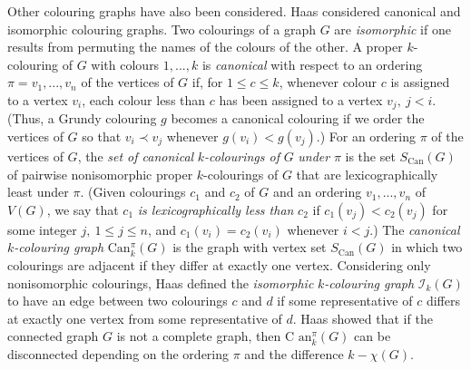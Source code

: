\documentclass[12pt]{article}%
\begin{document}


Other colouring graphs have also been considered. Haas \cite{26CM-Haas2012}
considered canonical and isomorphic colouring graphs. Two colourings of a
graph $G$ are \emph{isomorphic} if one results from permuting the names of the
colours of the other. A proper $k$-colouring of $G$ with colours $1,...,k$ is
\emph{canonical} with respect to an ordering $\pi=v_{1},...,v_{n}$ of the
vertices of $G$ if, for $1\leq c\leq k$, whenever colour $c$ is assigned to a
vertex $v_{i}$, each colour less than $c$ has been assigned to a vertex
$v_{j},\ j<i$. (Thus, a Grundy colouring $g$ becomes a canonical colouring if
we order the vertices of $G$ so that $v_{i}\prec v_{j}$ whenever
$g(v_{i})<g(v_{j})$.) For an ordering $\pi$ of the vertices of $G$, the
\emph{set of canonical }$k$\emph{-colourings of }$G$\emph{ under }$\pi$ is the
set $S_{\mathrm{Can}}(G)$ of pairwise nonisomorphic proper $k$-colourings of
$G$ that are lexicographically least under $\pi$. (Given colourings $c_{1}$
and $c_{2}$ of $G$ and an ordering $v_{1},...,v_{n}$ of $V(G)$, we say that
$c_{1}$ \emph{is lexicographically less than }$c_{2}$ if $c_{1}(v_{j}%
)<c_{2}(v_{j})$ for some integer $j,\ 1\leq j\leq n$, and $c_{1}(v_{i}%
)=c_{2}(v_{i})$ whenever $i<j$.) The \emph{canonical }$k$\emph{-colouring
graph} \textrm{C}$\mathrm{an}_{k}^{\pi}(G)$ is the graph with vertex set
$S_{\mathrm{Can}}(G)$ in which two colourings are adjacent if they differ at
exactly one vertex. Considering only nonisomorphic colourings, Haas defined
the \emph{isomorphic }$k$\emph{-colouring graph} $\mathcal{I}_{k}(G)$ to have
an edge between two colourings $c$ and $d$ if some representative of $c$
differs at exactly one vertex from some representative of $d$. Haas showed
that if the connected graph $G$ is not a complete graph, then \textrm{C}%
$\mathrm{an}_{k}^{\pi}(G)$ can be disconnected depending on the ordering $\pi$
and the difference $k-\chi(G)$. 
\end{document}
